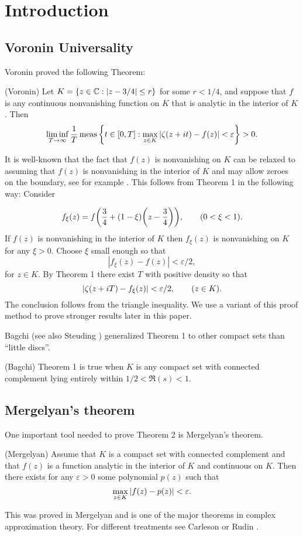 \documentclass[11pt]{article}
\begin{document}
\section{Introduction}

\subsection{Voronin Universality}

Voronin \cite{Voronin2, Voronin0} proved the following Theorem:
\begin{thm}(Voronin)  Let 
 $K=\{ z \in {\mathbb C} :|z-3/4| \leq r\}$ for some $r<1/4$, and suppose that $f$ is any continuous nonvanishing function on $K$ that is analytic  in the interior of $K$. Then 
$$\liminf_{T \to \infty} \frac 1 T \mathop{\rm meas} \left \{t \in [0,T]:\max_{z \in K} {\left| {\zeta(z+it)-f(z)} \right|}<\varepsilon \right \}>0. $$
\end{thm}


It is well-known that the fact  that $f(z)$ is nonvanishing on $K$ can be relaxed to assuming that $f(z)$ is nonvanishing in the interior of $K$ and may allow zeroes on the boundary, see for example  \cite[p. 251, Theorem 2]{VorKar}. This follows from Theorem 1 in the following way: Consider 

$$f_\xi(z)=f{\left( {\frac 3 4+(1-\xi){\left( {z-\frac 3 4} \right)}} \right)}, \qquad (0<\xi<1).$$  
If $f(z)$ is nonvanishing in the interior of $K$ then $f_\xi(z)$ is nonvanishing on $K$ for any $\xi>0$. Choose $\xi$ small enough so that $$|f_\xi(z)-f(z)|<\varepsilon/2,$$ for $z \in K$. By Theorem 1 there exist $T$ with positive density so that $${\left| {\zeta(z+iT)-f_\xi(z)} \right|}<\varepsilon/2, \qquad (z \in K).$$ The conclusion follows from the triangle inequality. We use a variant of this proof method to prove stronger results later in this paper.


Bagchi \cite{Bagchi}  (see also Steuding \cite[Theorem 1.9]{Steuding}) generalized Theorem 1 to other compact sets than ``little discs''. 
\begin{thm} (Bagchi) Theorem 1 is true when $K$ is any compact set with connected complement lying entirely within $1/2<\Re(s)<1$.
\end{thm}

\subsection{Mergelyan's theorem}

 One important tool needed to prove Theorem 2  is Mergelyan's theorem.
\begin{thm}(Mergelyan) Assume that $K$ is a compact set with connected complement and that $f(z)$ is a function analytic in the interior of $K$ and continuous on $K$. Then there exists for any $\varepsilon>0$ some polynomial $p(z)$ such that
$$
 \max_{z \in K}{\left| {f(z)-p(z)} \right|}<\varepsilon.
$$
\end{thm}
This was proved in Mergelyan \cite{Mergelyan} and is one of the major theorems in complex approximation theory. For different treatments see Carleson \cite{Carleson} or Rudin \cite[Theorem 20.5]{Rudin}.
\end{document}
